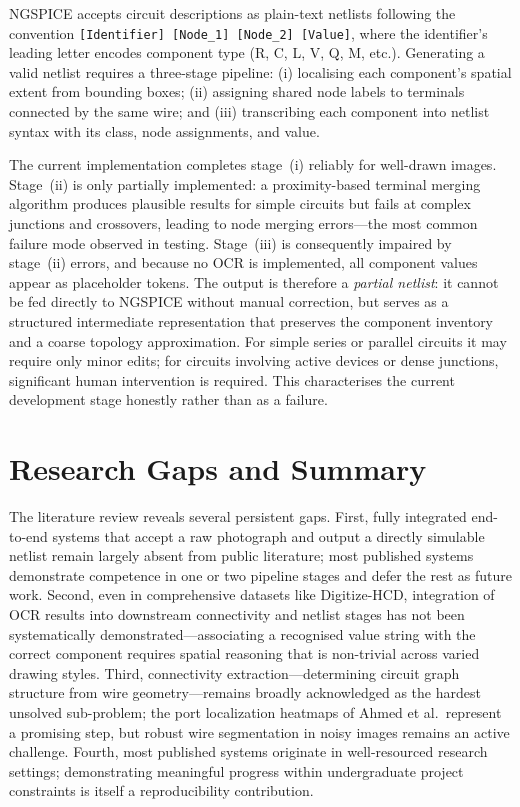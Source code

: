 NGSPICE accepts circuit descriptions as plain-text netlists following the convention \texttt{[Identifier] [Node\_1] [Node\_2] [Value]}, where the identifier's leading letter encodes component type (R, C, L, V, Q, M, etc.). Generating a valid netlist requires a three-stage pipeline: (i) localising each component's spatial extent from bounding boxes; (ii) assigning shared node labels to terminals connected by the same wire; and (iii) transcribing each component into netlist syntax with its class, node assignments, and value.

The current implementation completes stage~(i) reliably for well-drawn images. Stage~(ii) is only partially implemented: a proximity-based terminal merging algorithm produces plausible results for simple circuits but fails at complex junctions and crossovers, leading to node merging errors—the most common failure mode observed in testing. Stage~(iii) is consequently impaired by stage~(ii) errors, and because no OCR is implemented, all component values appear as placeholder tokens. The output is therefore a \emph{partial netlist}: it cannot be fed directly to NGSPICE without manual correction, but serves as a structured intermediate representation that preserves the component inventory and a coarse topology approximation. For simple series or parallel circuits it may require only minor edits; for circuits involving active devices or dense junctions, significant human intervention is required. This characterises the current development stage honestly rather than as a failure.

\section{Research Gaps and Summary}

The literature review reveals several persistent gaps. First, fully integrated end-to-end systems that accept a raw photograph and output a directly simulable netlist remain largely absent from public literature; most published systems demonstrate competence in one or two pipeline stages and defer the rest as future work. Second, even in comprehensive datasets like Digitize-HCD, integration of OCR results into downstream connectivity and netlist stages has not been systematically demonstrated—associating a recognised value string with the correct component requires spatial reasoning that is non-trivial across varied drawing styles. Third, connectivity extraction—determining circuit graph structure from wire geometry—remains broadly acknowledged as the hardest unsolved sub-problem; the port localization heatmaps of Ahmed et al.\ represent a promising step, but robust wire segmentation in noisy images remains an active challenge. Fourth, most published systems originate in well-resourced research settings; demonstrating meaningful progress within undergraduate project constraints is itself a reproducibility contribution.

